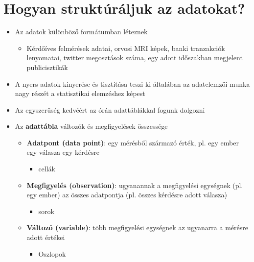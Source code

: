 \documentclass[
  letterpaper,
  DIV=11,
  numbers=noendperiod]{scrreprt}
\providecommand{\tightlist}{%
  \setlength{\itemsep}{0pt}\setlength{\parskip}{0pt}}\usepackage{longtable,booktabs,array}
\begin{document}
\hypertarget{hogyan-struktuxfaruxe1ljuk-az-adatokat}{%
\section{Hogyan struktúráljuk az
adatokat?}\label{hogyan-struktuxfaruxe1ljuk-az-adatokat}}

\begin{itemize}
\item
  Az adatok különböző formátumban léteznek

  \begin{itemize}
  \tightlist
  \item
    Kérdőíves felmérések adatai, orvosi MRI képek, banki tranzakciók
    lenyomatai, twitter megosztások száma, egy adott időszakban
    megjelent publicisztikák
  \end{itemize}
\item
  A nyers adatok kinyerése és tisztítása teszi ki általában az
  adatelemzői munka nagy részét a statisztikai elemzéshez képest
\item
  Az egyszerűség kedvéért az órán adattáblákkal fogunk dolgozni
\item
  Az \textbf{adattábla} változók és megfigyelések összessége

  \begin{itemize}
  \item
    \textbf{Adatpont (data point)}: egy mérésből származó érték, pl. egy
    ember egy válasza egy kérdésre

    \begin{itemize}
    \tightlist
    \item
      cellák
    \end{itemize}
  \item
    \textbf{Megfigyelés (observation)}: ugyanannak a megfigyelési
    egységnek (pl. egy ember) az összes adatpontja (pl. összes kérdésre
    adott válasza)

    \begin{itemize}
    \tightlist
    \item
      sorok
    \end{itemize}
  \item
    \textbf{Változó (variable)}: több megfigyelési egységnek az
    ugyanarra a mérésre adott értékei

    \begin{itemize}
    \tightlist
    \item
      Oszlopok
    \end{itemize}
  \end{itemize}
\end{itemize}
\end{document}
